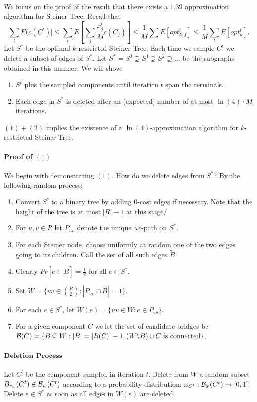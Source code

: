 \documentclass[letterpaper,12pt,oneside,onecolumn]{article}
\begin{document}
\paragraph{}
We focus on the proof of the result that there exists a $1.39$ approximation algorithm for Steiner Tree.
Recall that $$\sum_t E(c(C^t)] \leq \sum_{t} E[\sum_j \frac{x_j^t}{M} c(C_j)] \leq \frac{1}{M} \sum_t E[opt^t_{k,f}] \leq \frac{1}{M} \sum_t E[opt^t_k].$$
Let $S^*$ be the optimal $k$-restricted Steiner Tree. Each time we sample $C^t$ we delete a subset of edges of $S^*$. Let $S^* = S^0 \supseteq S^1 \supseteq S^2 \supseteq \dots$ be the subgraphs obtained in this manner. We will show:
\begin{enumerate}
\item $S^t$ plus the sampled components until iteration $t$ span the terminals.
\item Each edge in $S^*$ is deleted after an (expected) number of at most $\ln (4) \cdot M$ iterations.
\end{enumerate}
$(1) + (2)$ implies the existence of a $\ln(4)$-approximation algorithm for $k$-restricted Steiner Tree.
\paragraph{Proof of $(1)$}
We begin with demonstrating $(1)$. How do we delete edges from $S^*$? By the following random process:
\begin{enumerate}
\item Convert $S^*$ to a binary tree by adding $0$-cost edges if necessary. Note that the height of the tree is at most $|R|-1$ at this stage/
\item For $u,v \in R$ let $P_{uv}$ denote the unique $uv$-path on $S^*$.
\item For each Steiner node, choose uniformly at random one of the two edges going to its children. Call the set of all such edges $\tilde{B}$.
\item Clearly $Pr[e \in \tilde{B}] = \frac{1}{2}$ for all $e \in S^*$.
\item Set $W = \{ uv \in {R\choose 2} : |P_{uv} \cap \tilde{B}| = 1\}$.
\item For each $e \in S^*$, let $W(e) = \{uv \in W: e \in P_{uv}\}$.
\item For a given component $C$ we let the set of candidate bridges be $\mathcal{B}(C) = \{B \subseteq W: |B| = |R(C)| - 1, (W\backslash B) \cup C \text{ is connected} \}$.
\end{enumerate}
\paragraph{Deletion Process}
Let $C^t$ be the component sampled in iteration $t$. Delete from $W$ a random subset $\bar{B_{r_w}}(C^t) \in \mathcal{B}_w (C^t)$ according to a probability distribution: $\omega_{C^t} : \mathcal{B}_w (C^t) \rightarrow [0,1].$ Delete $e \in S^*$ as soon as all edges in $W(e)$ are deleted.
\end{document}

